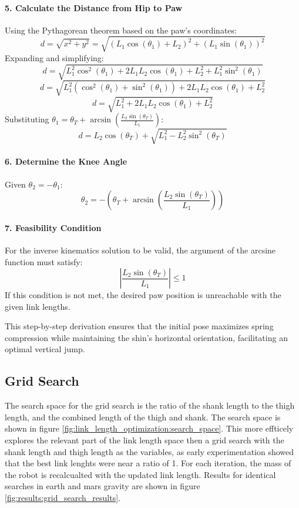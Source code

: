 \paragraph{5. Calculate the Distance from Hip to Paw}

Using the Pythagorean theorem based on the paw's coordinates:
\[
d = \sqrt{x^2 + y^2} = \sqrt{(L_1 \cos(\theta_1) + L_2)^2 + (L_1 \sin(\theta_1))^2}
\]
Expanding and simplifying:
\[
d = \sqrt{L_1^2 \cos^2(\theta_1) + 2 L_1 L_2 \cos(\theta_1) + L_2^2 + L_1^2 \sin^2(\theta_1)}
\]
\[
d = \sqrt{L_1^2 (\cos^2(\theta_1) + \sin^2(\theta_1)) + 2 L_1 L_2 \cos(\theta_1) + L_2^2}
\]
\[
d = \sqrt{L_1^2 + 2 L_1 L_2 \cos(\theta_1) + L_2^2}
\]
Substituting \( \theta_1 = \theta_T + \arcsin\left(\frac{L_2 \sin(\theta_T)}{L_1}\right) \):
\[
d = L_2 \cos(\theta_T) + \sqrt{L_1^2 - L_2^2 \sin^2(\theta_T)}
\]

\paragraph{6. Determine the Knee Angle}

Given \( \theta_2 = -\theta_1 \):
\[
\theta_2 = -\left( \theta_T + \arcsin\left(\frac{L_2 \sin(\theta_T)}{L_1}\right) \right)
\]

\paragraph{7. Feasibility Condition}

For the inverse kinematics solution to be valid, the argument of the arcsine function must satisfy:
\[
\left| \frac{L_2 \sin(\theta_T)}{L_1} \right| \leq 1
\]
If this condition is not met, the desired paw position is unreachable with the given link lengths.

This step-by-step derivation ensures that the initial pose maximizes spring compression while maintaining the shin's horizontal orientation, facilitating an optimal vertical jump.









\subsection{Grid Search}
The search space for the grid search is the ratio of the shank length to the thigh length, and the combined length of the thigh and shank. The search space is shown in figure \ref{fig:link_length_optimization:search_space}. This more effticely explores the relevant part of the link length space then a grid search with the shank length and thigh length as the variables, as early experimentation showed that the best link lenghts were near a ratio of 1. For each iteration, the mass of the robot is recalcualted with the updated link length. Results for identical searches in earth and mars gravity are shown in figure \ref{fig:results:grid_search_results}.
